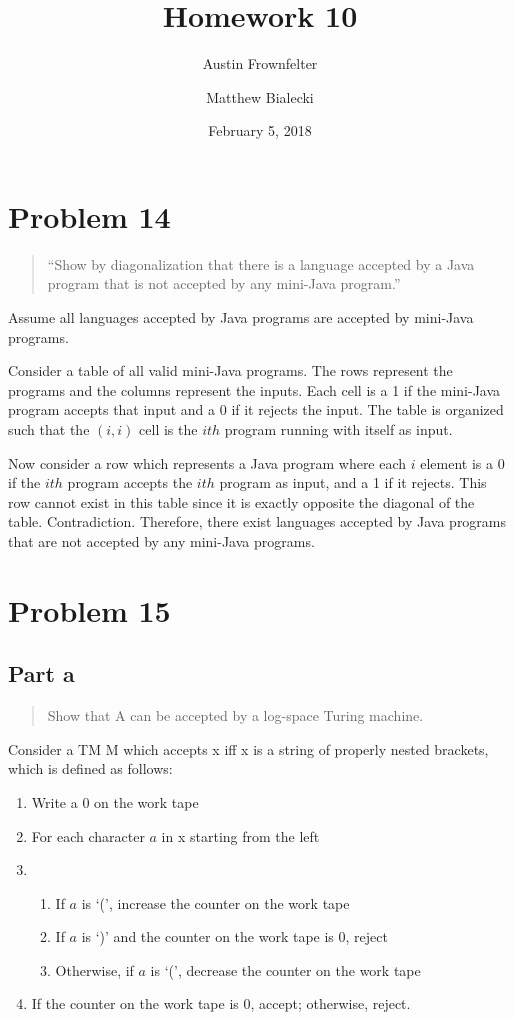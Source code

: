 \documentclass{article}
\title{Homework 10}
\author{Austin Frownfelter \and Matthew Bialecki}
\date{February 5, 2018}
\begin{document}
\maketitle

\section{Problem 14}
\begin{quote}
``Show by diagonalization that there is a language accepted by a Java program that is not accepted by any mini-Java program.''
\end{quote}

Assume all languages accepted by Java programs are accepted by mini-Java programs.

Consider a table of all valid mini-Java programs.  The rows represent the programs and the columns represent the inputs.  Each cell is a 1 if the mini-Java program accepts that input and a 0 if it rejects the input.  The table is organized such that the $(i,i)$ cell is the $ith$ program running with itself as input.

Now consider a row which represents a Java program where each $i$ element is a 0 if the $ith$ program accepts the $ith$ program as input, and a 1 if it rejects.  This row cannot exist in this table since it is exactly opposite the diagonal of the table.  Contradiction.  Therefore, there exist languages accepted by Java programs that are not accepted by any mini-Java programs.

\section{Problem 15}
\subsection{Part a}
\begin{quote}
Show that A can be accepted by a log-space Turing machine.
\end{quote}

Consider a TM M which accepts x iff x is a string of properly nested brackets, which is defined as follows:
\begin{enumerate}[label=]
\item Write a 0 on the work tape
\item For each character $a$ in x starting from the left
\item \begin{enumerate}[label=]
\item If $a$ is `(', increase the counter on the work tape
\item If $a$ is `)' and the counter on the work tape is 0, reject
\item Otherwise, if $a$ is `(', decrease the counter on the work tape
\end{enumerate}
\item If the counter on the work tape is 0, accept; otherwise, reject.
\end{enumerate}
\end{document}
